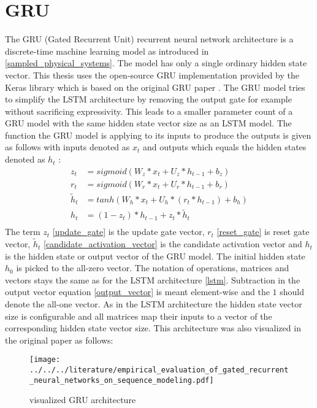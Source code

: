 \documentclass[draft,final]{vutinfth} %
\begin{document}
    \section{GRU} \label{gru}
    The GRU (Gated Recurrent Unit) recurrent neural network architecture is a discrete-time machine learning model as introduced in \ref{sampled_physical_systems}.
    The model has only a single ordinary hidden state vector.
    This thesis uses the open-source GRU implementation provided by the Keras library \cite{Keras} which is based on the original GRU paper \cite{GRU}.
    The GRU model tries to simplify the LSTM architecture by removing the output gate for example without sacrificing expressivity.
    This leads to a smaller parameter count of a GRU model with the same hidden state vector size as an LSTM model.
    The function the GRU model is applying to its inputs to produce the outputs is given as follows with inputs denoted as $x_t$ and outputs which equals the hidden states denoted as $h_t$ \cite[p. 4]{GRU}:
    \begin{align}
    \label{update_gate} z_t &= sigmoid(W_z*x_t + U_z*h_{t-1} + b_z) \\
    \label{reset_gate} r_t &= sigmoid(W_r*x_t + U_r*h_{t-1} + b_r) \\
    \label{candidate_activation_vector} \tilde{h}_t &= tanh(W_h*x_t + U_h*(r_t * h_{t-1}) + b_h) \\
    \label{output_vector} h_t &= (1 - z_t) * h_{t-1} + z_t * \tilde{h}_t \\
    \end{align}
    The term $z_t$ \ref{update_gate} is the update gate vector, $r_t$ \ref{reset_gate} is reset gate vector, $\tilde{h}_t$ \ref{candidate_activation_vector} is the candidate activation vector and $h_t$ is the hidden state or output vector of the GRU model.
    The initial hidden state $h_0$ is picked to the all-zero vector.
    The notation of operations, matrices and vectors stays the same as for the LSTM architecture \ref{lstm}.
    Subtraction in the output vector equation \ref{output_vector} is meant element-wise and the $1$ should denote the all-one vector.
    As in the LSTM architecture the hidden state vector size is configurable and all matrices map their inputs to a vector of the corresponding hidden state vector size.
    This architecture was also visualized in the original paper as follows:
    \begin{figure}[H]
        \centering{}
        \texttt{[image: ../../../literature/empirical\_evaluation\_of\_gated\_recurrent\_neural\_networks\_on\_sequence\_modeling.pdf]}
        \caption{visualized GRU architecture \cite[p. 3]{GRU}}
        \label{fig:gru_vis}
    \end{figure}
\end{document}
